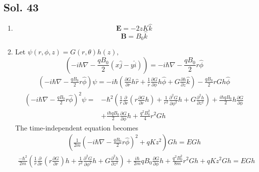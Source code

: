        \subsection*{Sol. 43}
       \begin{enumerate}
           \item 
           $$
           \bm E = -2zK\hat k
           $$
           $$
           \bm B = B_0\hat k
           $$
           \item 
           Let $\psi(r, \phi, z)=G(r,\theta)h(z),$
           $$
           (-i\hbar\nabla-\frac{qB_0}{2}(x\hat j-y\hat i))
           =-i\hbar\nabla - \frac{qB_0}{2}r\hat\phi
           $$
           \begin{align*}
               (-i\hbar\nabla-\frac{qB_0}{2}r\hat\phi)\psi = 
               -i\hbar(\frac{\partial G}{\partial r}h\hat r + \frac{1}{r}\frac{\partial G}{\partial\phi}h\hat \phi + G\frac{\partial h}{\partial z}\hat k)
               -\frac{qB_0}{2}rGh\hat \phi
           \end{align*}
           \begin{align*}
               (-i\hbar\nabla-\frac{qB_0}{2}r\hat\phi)^2\psi= & 
               -\hbar^2
               (\frac{1}{r}\frac{\partial}{\partial r}(r\frac{\partial G}{\partial r}h)+
               \frac{1}{r^2}\frac{\partial^2G}{\partial\phi^2}
               h+G\frac{\partial^2h}{\partial z^2}
               )
               +\frac{i\hbar qB_0}{2}h\frac{\partial G}{\partial \phi}\\
               &+\frac{i\hbar qB_0}{2}\frac{\partial G}{\partial\phi}h + 
               \frac{q^2B_0^2}{4}r^2Gh
           \end{align*}
           The time-independent equation becomes
           \begin{align*}
               (\frac{1}{2m} (-i\hbar\nabla-\frac{qB_0}{2}r\hat\phi)^2+qKz^2)Gh =EGh
           \end{align*}
           \begin{align*}
               \frac{-\hbar^2}{2m}
               (\frac{1}{r}\frac{\partial}{\partial r}(r\frac{\partial G}{\partial r})h + 
               \frac{1}{r^2}\frac{\partial^2G}{\partial\phi^2}
               h + G\frac{\partial^2 h}{\partial z^2}
               )
               + 
               \frac{i\hbar}{2m}qB_0\frac{\partial G}{\partial\phi}h 
               +\frac{q^2B_0^2}{8m}r^2Gh 
               +qKz^2Gh= EGh
           \end{align*}
           \begin{align*}

\end{align*}
\end{enumerate}
